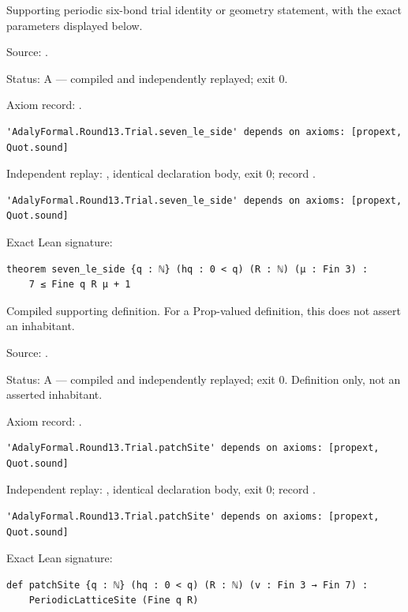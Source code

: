 \begin{theorem}[bp-342]
\label{bp-342}
\leanok
Supporting periodic six-bond trial identity or geometry statement, with the exact parameters displayed below.

\par Source: \texttt{}.
\par Status: A — compiled and independently replayed; exit 0.
\par Axiom record: \texttt{}.
\begin{verbatim}
'AdalyFormal.Round13.Trial.seven_le_side' depends on axioms: [propext, Quot.sound]
\end{verbatim}
\par Independent replay: \texttt{}, identical declaration body, exit 0; record \texttt{}.
\begin{verbatim}
'AdalyFormal.Round13.Trial.seven_le_side' depends on axioms: [propext, Quot.sound]
\end{verbatim}
\par Exact Lean signature:
\begin{verbatim}
theorem seven_le_side {q : ℕ} (hq : 0 < q) (R : ℕ) (μ : Fin 3) :
    7 ≤ Fine q R μ + 1
\end{verbatim}
\end{theorem}

\begin{definition}[bp-343]
\label{bp-343}
\leanok
Compiled supporting definition. For a Prop-valued definition, this does not assert an inhabitant.

\par Source: \texttt{}.
\par Status: A — compiled and independently replayed; exit 0. Definition only, not an asserted inhabitant.
\par Axiom record: \texttt{}.
\begin{verbatim}
'AdalyFormal.Round13.Trial.patchSite' depends on axioms: [propext, Quot.sound]
\end{verbatim}
\par Independent replay: \texttt{}, identical declaration body, exit 0; record \texttt{}.
\begin{verbatim}
'AdalyFormal.Round13.Trial.patchSite' depends on axioms: [propext, Quot.sound]
\end{verbatim}
\par Exact Lean signature:
\begin{verbatim}
def patchSite {q : ℕ} (hq : 0 < q) (R : ℕ) (v : Fin 3 → Fin 7) :
    PeriodicLatticeSite (Fine q R)
\end{verbatim}
\end{definition}

